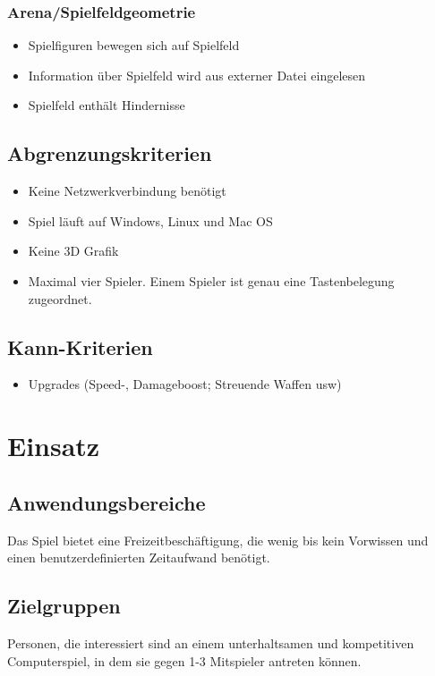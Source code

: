 \subsubsection{Arena/Spielfeldgeometrie}
\begin{itemize}
\item Spielfiguren bewegen sich auf Spielfeld
\item Information über Spielfeld wird aus externer Datei eingelesen
\item Spielfeld enthält Hindernisse
\end{itemize}




\subsection{Abgrenzungskriterien}
\begin{itemize}
\item Keine Netzwerkverbindung benötigt
\item Spiel läuft auf Windows, Linux und Mac OS
\item Keine 3D Grafik
\item Maximal vier Spieler. Einem Spieler ist genau eine Tastenbelegung zugeordnet.

\end{itemize}

\subsection{Kann-Kriterien}
\begin{itemize}
\item Upgrades (Speed-, Damageboost; Streuende Waffen usw)
\end{itemize}

\section{Einsatz}
\subsection{Anwendungsbereiche}
Das Spiel bietet eine Freizeitbeschäftigung, die wenig bis kein Vorwissen und einen benutzerdefinierten Zeitaufwand benötigt. 
\subsection{Zielgruppen}
Personen, die interessiert sind an einem unterhaltsamen und kompetitiven Computerspiel, in dem sie gegen 1-3 Mitspieler antreten können.

